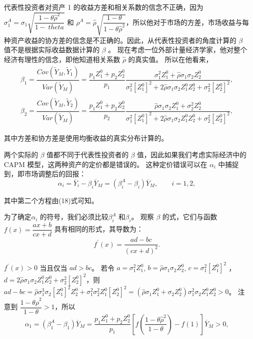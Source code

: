 \documentclass[10.0pt]{article}
\begin{document}
代表性投资者对资产 1 的收益方差和相关系数的信念不正确，因为 $\sigma_1^A = \sigma_1 \sqrt{\dfrac{1 - \theta \hat{\rho}^2}{1 - \ theta}} $ 和 $ \rho^A = \hat{\rho} \sqrt{\dfrac{1 - \theta}{1 - \theta \hat{\rho}^2}} $，所以他对于市场的方差，市场收益与每种资产收益的协方差的信念是不正确的。因此，从代表性投资者的角度计算的 $\beta$ 值不是根据实际收益数据计算的 $\beta$ 。 现在考虑一位外部计量经济学家，他对整个经济有理性的信念，即他知道相关系数 $ \hat{\rho} $ 的真实值。 所以在他看来，
\begin{eqnarray*}
& \beta_1 = \dfrac{Cov (\tilde{Y}_M, \tilde{Y}_1)}{Var (\tilde{Y}_M)} = \dfrac{p_1 Z_1^0 + p_2 Z_2^0}{p_1} \dfrac{\sigma_1^2 Z_1^0 + \hat{\rho} \sigma_1 \sigma_2 Z_2^0}{\sigma_1^2 \left[ Z_1^0 \right]^2 + 2 \hat{\rho} \sigma_1 \sigma_2 Z_1^0 Z_2^0 + \sigma_2^2 \left[ Z_2^0 \right]^2}, & \\
& \beta_2 = \dfrac{Cov (\tilde{Y}_M, \tilde{Y}_2)}{Var (\tilde{Y}_M)} = \dfrac{p_1 Z_1^0 + p_2 Z_2^0}{p_2} \dfrac{\hat{\rho} \sigma_1 \sigma_2 Z_1^0 + \sigma_2^2 Z_2^0}{\sigma_1^2 \left[ Z_1^0 \right]^2 + 2 \hat{\rho} \sigma_1 \sigma_2 Z_1^0 Z_2^0 + \sigma_2^2 \left[ Z_2^0 \right]^2}, &
\end{eqnarray*}


其中方差和协方差是使用均衡收益的真实分布计算的。



两个实际的 $\beta$ 值都不同于代表性投资者的 $\beta$ 值，因此如果我们考虑实际经济中的 CAPM 模型，这两种资产的定价都是错误的。 这种定价错误可以在 $\alpha_i$ 中捕捉到，即市场调整后的回报：
\begin{equation*}
\alpha_i = \overline{Y}_i - \beta_i \overline{Y}_M = (\beta_i^A - \beta_i) \overline{Y}_M, \qquad i = 1, 2, 
\end{equation*}


其中第二个方程由(18)式可知。



为了确定$ \alpha_i $ 的符号，我们必须比较$ \beta_i^A $ 和$ \beta_i $。 观察 $\beta$ 的式，它们与函数 $ f (x) = \dfrac{a x + b}{c x + d} $ 具有相同的形式，其导数为：
\begin{equation*}
f^{\prime} (x) = \dfrac{a d - b c}{(c x + d)^2}.
\end{equation*}


$ f^{\prime} (x) > 0 $ 当且仅当 $ a d > b c $。 若令 $ a = \sigma_1^2 Z_1^0 $, $ b = \hat{\rho} \sigma_1 \sigma_2 Z_2^0 $, $ c = \sigma_1^2 \left[ Z_1^0 \right] ^2 $ ， $ d = 2 \hat{\rho} \sigma_1 \sigma_2 Z_1^0 Z_2^0 + \sigma_2^2 \left[ Z_2^0 \right]^2 $，则 $ a d - b c = \hat {\rho} \sigma_1^3 \sigma_2 \left[ Z_1^0 \right]^2 Z_2^0 + \sigma_1^2 \sigma_2^2 Z_1^0 \left[ Z_2^0 \right]^2 = (\hat{\rho} \sigma_1 Z_1^0 + \sigma_2 Z_2^0) \sigma_1^2 \sigma_2 Z_1^0 Z_2^0 > 0 $。 注意到 $ \dfrac{1 - \theta\hat{\rho}^2}{1 - \theta} > 1 $，所以
\begin{equation*}
\alpha_1 = (\beta_1^A - \beta_1) \overline{Y}_M = \dfrac{p_1 Z_1^0 + p_2 Z_2^0}{p_1} \left[ f \left( \dfrac{1 - \theta\hat{\rho}^2}{1 - \theta} \right) - f (1) \right] \overline{Y}_M > 0,
\end{equation*} 
\end{document}
